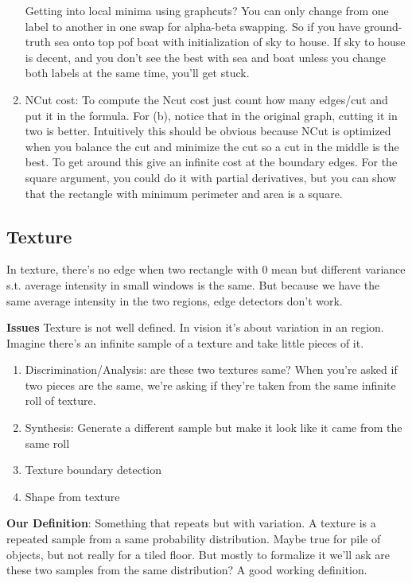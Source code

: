 \begin{enumerate}
Getting into local minima using graphcuts? You can only change from
one label to another in one swap for alpha-beta swapping. So if you
have ground-truth sea onto top pof boat with initialization of sky to
house. If sky to house is decent, and you don't see the best with sea
and boat unless you change both labels at the same time, you'll get
stuck.
\item NCut cost: To compute the Ncut cost just count how many
  edges/cut and put it in the formula. For (b), notice that in the
  original graph, cutting it in two is better. Intuitively this should
  be obvious because NCut is optimized when you balance the cut and
  minimize the cut so a cut in the middle is the best. To get around
  this give an infinite cost at the boundary edges. For the square
  argument, you could do it with partial derivatives, but you can show
  that the rectangle with minimum perimeter and area is a square.
\end{enumerate}

\subsection{Texture}
\label{sec:texture}
In texture, there's no edge when two rectangle with 0 mean but
different variance s.t. average intensity in small windows is
the same. But because we have the same average intensity in the two
regions, edge detectors don't work.

\textbf{Issues} 
Texture is not well defined. In vision it's about
variation in an region. Imagine there's an infinite sample of a
texture and take little pieces of it.
\begin{enumerate}
\item Discrimination/Analysis: are these two textures same?  When you're asked if two
pieces are the same, we're asking if they're taken from the same
infinite roll of texture. 
\item Synthesis: Generate a different sample but make it look like it
  came from the same roll
\item Texture boundary detection
\item Shape from texture
\end{enumerate}

\textbf{Our Definition}: Something that repeats but with
variation. A texture is a repeated sample from a same probability
distribution. Maybe true for pile of objects, but not really for a
tiled floor. But mostly to formalize it we'll ask are these two
samples from the same distribution? A good working definition.

